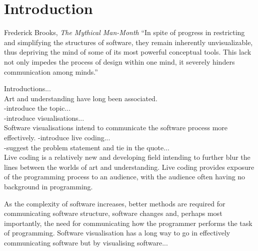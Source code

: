 
\chapter{Introduction}
\label{chap:introduction}

\begin{chapquote}{Frederick Brooks, \textit{The Mythical Man-Month}}
``In spite of progress in restricting and simplifying the structures of software, they remain inherently unvisualizable, thus depriving the mind of some of its most powerful conceptual tools. This lack not only impedes the process of design within one mind, it severely hinders communication among minds.''
\end{chapquote}



Introductions...\\
Art and understanding have long been associated.\\
-introduce the topic...\\

-introduce visualisations...\\
Software visualisations intend to communicate the software process more effectively.
-introduce live coding...\\
-suggest the problem statement and tie in the quote...\\
Live coding is a relatively new and developing field intending to further blur the lines between the worlds of art and understanding. Live coding provides exposure of the programming process to an audience, with the audience often having no background in programming.

As the complexity of software increases, better methods are required for communicating software structure, software changes and, perhaps most importantly, the need for communicating how the programmer performs the task of programming. Software visualisation has a long way to go in effectively communicating software but by visualising software...


